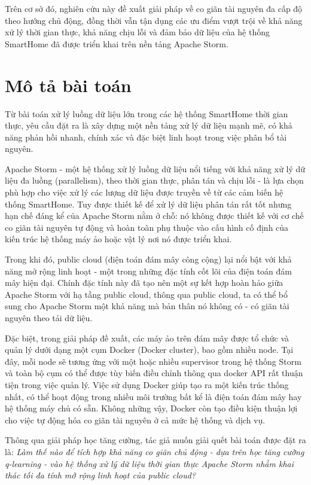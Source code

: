 Trên cơ sở đó, nghiên cứu này đề xuất giải pháp về co giãn tài nguyên đa cấp độ theo hướng chủ động, đồng thời vẫn tận dụng các ưu điểm vượt trội về khả năng xử lý thời gian thực, khả năng chịu lỗi và đảm bảo dữ liệu của hệ thống SmartHome đã được triển khai trên nền tảng Apache Storm.

\section{Mô tả bài toán}

Từ bài toán xử lý luồng dữ liệu lớn trong các hệ thống SmartHome thời gian thực, yêu cầu đặt ra là xây dựng một nền tảng xử lý dữ liệu mạnh mẽ, có khả năng phản hồi nhanh, chính xác và đặc biệt linh hoạt trong việc phân bổ tài nguyên.

Apache Storm - một hệ thống xử lý luồng dữ liệu nổi tiếng với khả năng xử lý dữ liệu đa luồng (parallelism), theo thời gian thực, phân tán và chịu lỗi - là lựa chọn phù hợp cho việc xử lý các lượng dữ liệu được truyền về từ các cảm biến hệ thống SmartHome. Tuy được thiết kế để xử lý dữ liệu phân tán rất tốt nhưng hạn chế đáng kể của Apache Storm nằm ở chỗ: nó không được thiết kế với cơ chế co giãn tài nguyên tự động và hoàn toàn phụ thuộc vào cấu hình cố định của kiến trúc hệ thống máy ảo hoặc vật lý nơi nó được triển khai.

Trong khi đó, public cloud (điện toán đám mây công cộng) lại nổi bật với khả năng mở rộng linh hoạt - một trong những đặc tính cốt lõi của điện toán đám mây hiện đại. Chính đặc tính này đã tạo nên một sự kết hợp hoàn hảo giữa Apache Storm với hạ tầng public cloud, thông qua public cloud, ta có thể bổ sung cho Apache Storm một khả năng mà bản thân nó không có - có giãn tài nguyên theo tải dữ liệu.

Đặc biệt, trong giải pháp đề xuất, các máy ảo trên đám mây được tổ chức và quản lý dưới dạng một cụm Docker (Docker cluster), bao gồm nhiều node. Tại đây, mỗi node sẽ tương ứng với một hoặc nhiều supervisor trong hệ thống Storm và toàn bộ cụm có thể được tùy biến điều chỉnh thông qua docker API rất thuận tiện trong việc quản lý. Việc sử dụng Docker giúp tạo ra một kiến trúc thống nhất, có thể hoạt động trong nhiều môi trường bất kể là điện toán đám mây hay hệ thống máy chủ có sẵn. Không những vậy, Docker còn tạo điều kiện thuận lợi cho việc tự động hóa co giãn tài nguyên ở cả mức hệ thống và dịch vụ.

Thông qua giải pháp học tăng cường, tác giả muốn giải quết bài toán được đặt ra là: \textit{Làm thế nào để tích hợp khả năng co giãn chủ động - dựa trên học tăng cường q-learning - vào hệ thống xử lý dữ liệu thời gian thực Apache Storm nhằm khai thác tối đa tính mở rộng linh hoạt của public cloud?}

